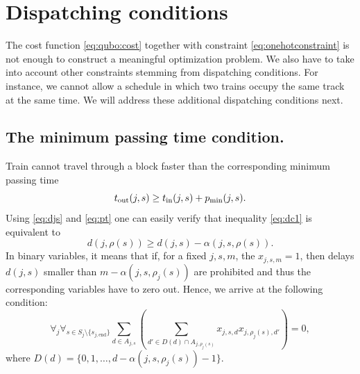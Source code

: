 \section{Dispatching conditions}
The cost function \eqref{eq:qubo:cost} together with constraint
\eqref{eq:onehotconstraint} is not enough to construct a meaningful
optimization problem. We also have to take into account other constraints
stemming from dispatching conditions. For instance, we cannot allow a schedule
in which two trains occupy the same track at the same time. We will address
these additional dispatching conditions next.

\subsection{The minimum passing time condition.}
Train cannot travel through a block faster than the corresponding minimum
passing time
\begin{equation}
  \label{eq:dc1}
  t_\text{out}(j, s) \ge t_\text{in}(j, s) + p_\text{min}(j, s).
\end{equation}
Using \eqref{eq:djs} and \eqref{eq:pt} one can easily verify that inequality
\eqref{eq:dc1} is equivalent to
\begin{equation}
  \label{eq:passingtime}
  d(j, \rho(s)) \ge d(j, s) - \alpha(j, s, \rho(s)).
\end{equation}
In binary variables, it means that if, for a fixed $j,s,m$, the $x_{j,s,m}=1$,
then delays $d(j,s)$ smaller than $m-\alpha(j, s, \rho_j(s))$ are prohibited
and thus the corresponding variables have to zero out. Hence, we arrive at the
following condition:
\begin{equation}
  \label{eq:qubo:passingtime}
  \forall_{j} \forall_{s \in S_j \setminus \{s_{{j,\text{end}}}\}}
  \sum_{d \in A_{j,s}}
  \left(
  \sum_{ d' \in D(d) \cap A_{j, \rho_j(s)}} x_{j, s, d}
  x_{j, \rho_j(s), d'} \right) = 0,
\end{equation}
where $D(d) = \{0, 1, \ldots, d - \alpha(j, s, \rho_j(s)) -1\}$.
